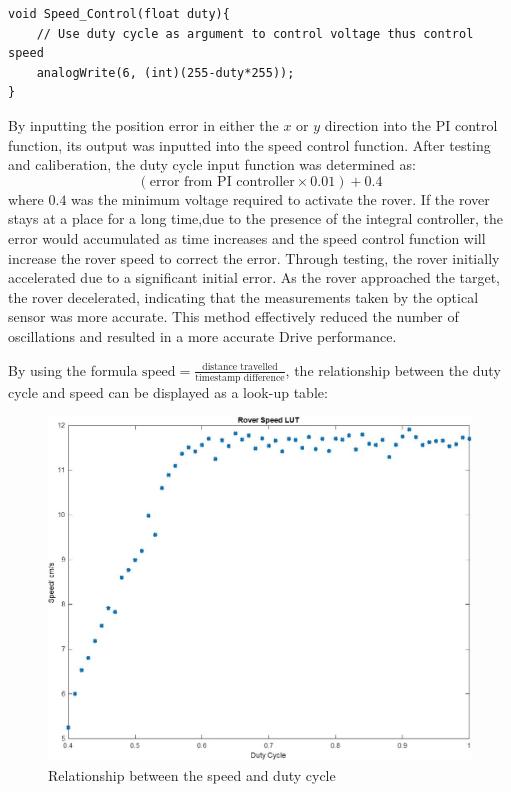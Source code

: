 \documentclass[11pt, a4paper]{article}
\begin{document}
\begin{lstlisting}
void Speed_Control(float duty){
    // Use duty cycle as argument to control voltage thus control speed
    analogWrite(6, (int)(255-duty*255)); 
}
\end{lstlisting}

By inputting the position error in either the $x$ or $y$ direction into the PI control function, its output was  inputted into the speed control function. After testing and caliberation, the duty cycle input function was determined as:
$$
    (\text{error from PI controller} \times 0.01) + 0.4
$$
where $0.4$ was the minimum voltage required to activate the rover. If the rover stays at a place for a long time,due to the presence of the integral controller, the error would accumulated as time increases and the speed control function will increase the rover speed to correct the error. Through testing, the rover initially accelerated due to a significant initial error. As the rover approached the target, the rover decelerated, indicating that the measurements taken by the optical sensor was more accurate. This method effectively reduced the number of oscillations and resulted in a more accurate Drive performance.

By using the formula $\text{speed} = \frac{\text{distance travelled}}{\text{timestamp difference}}$, the relationship between the duty cycle and speed can be displayed as a look-up table:
\begin{figure} [h!]
    \centering
    \includegraphics[scale=0.4]{Speed_duty_cycle.jpg}
    \caption{Relationship between the speed and duty cycle}
\end{figure}
\end{document}
